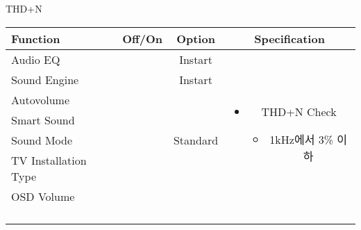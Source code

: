 \begin{frame}[t]{THD+N}
\begin{tiny}
\begin{tabular}{@{}lccc@{}}
\toprule
Function & Off/On & Option & Specification \\
\midrule
Audio EQ & \color{black}{Off} & Instart &
\multirow{10}{60mm}{
\begin{itemize}
\item THD+N Check
	\begin{itemize}
	\item 1kHz에서 3\% 이하
	\end{itemize}
\end{itemize}
} \\
Sound Engine & \color{black}{Off} & Instart & \\
Autovolume & \color{black}{Off} & & \\
Smart Sound & \color{black}{Off} & & \\
Sound Mode & \color{blue}{On} & Standard & \\
TV Installation Type & \color{blue}{On} & \color{black}{Standtype1} & \\
OSD Volume & \color{blue}{On} & \color{blue}{Vol.100} & \\
& & & \\
& & & \\
& & & \\
& & & \\
\midrule
\end{tabular}
\end{tiny}

\end{frame}



